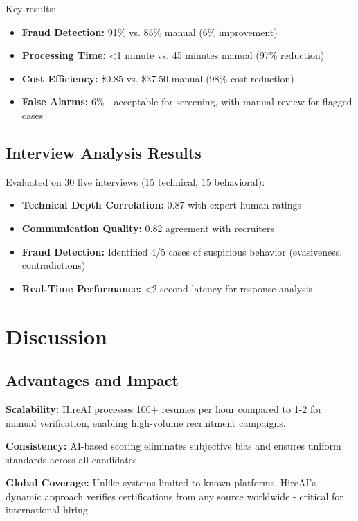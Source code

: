 \documentclass[journal]{IEEEtran}
\begin{document}
Key results:
\begin{itemize}
\item \textbf{Fraud Detection:} 91\% vs. 85\% manual (6\% improvement)
\item \textbf{Processing Time:} <1 minute vs. 45 minutes manual (97\% reduction)
\item \textbf{Cost Efficiency:} \$0.85 vs. \$37.50 manual (98\% cost reduction)
\item \textbf{False Alarms:} 6\% - acceptable for screening, with manual review for flagged cases
\end{itemize}

\subsection{Interview Analysis Results}

Evaluated on 30 live interviews (15 technical, 15 behavioral):

\begin{itemize}
\item \textbf{Technical Depth Correlation:} 0.87 with expert human ratings
\item \textbf{Communication Quality:} 0.82 agreement with recruiters
\item \textbf{Fraud Detection:} Identified 4/5 cases of suspicious behavior (evasiveness, contradictions)
\item \textbf{Real-Time Performance:} <2 second latency for response analysis
\end{itemize}

\section{Discussion}

\subsection{Advantages and Impact}

\textbf{Scalability:} HireAI processes 100+ resumes per hour compared to 1-2 for manual verification, enabling high-volume recruitment campaigns.

\textbf{Consistency:} AI-based scoring eliminates subjective bias and ensures uniform standards across all candidates.

\textbf{Global Coverage:} Unlike systems limited to known platforms, HireAI's dynamic approach verifies certifications from any source worldwide - critical for international hiring.
\end{document}
